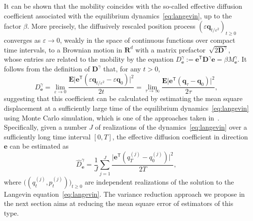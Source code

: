 \documentclass[11pt,a4paper]{article}
\newcommand{\expect}[0]{\mathbf{E}}
\newcommand{\real}{\mathbf R}
\newcommand{\vect}[1]{\boldsymbol{\mathbf #1}}
\newcommand{\mat}[1]{\vect #1}
\renewcommand{\t}{\mathsf T}
\theoremstyle{plain}
\numberwithin{equation}{section}
\renewcommand{\geq}{\geqslant}
\begin{document}
It can be shown that the mobility coincides with the so-called effective diffusion coefficient associated with the equilibrium dynamics~\eqref{eq:langevin},
up to the factor $\beta$.
More precisely,
the diffusively rescaled position process $(\varepsilon \vect q_{t/\varepsilon^2})_{t\geq0}$ converges as $\varepsilon \to 0$,
weakly in the space of continuous functions over compact time intervals,
to a Brownian motion in $\real^d$ with a matrix prefactor~$\sqrt{2 \mat D^{\gamma}}$,
whose entries are related to the mobility by the equation $D^{\gamma}_{\vect e} := \vect e^\t \mat D^{\gamma} \vect e = \beta M^{\gamma}_{\vect e}$.
It follows from the definition of $\mat D^{\gamma}$ that, for any $t > 0$,
\begin{equation}
    \label{eq:einsteins_formula}
    D^{\gamma}_{\vect e}
    =\lim_{\varepsilon \to 0} \frac{\expect\bigl\lvert \vect e^\t (\varepsilon \vect q_{t/\varepsilon^2} - \varepsilon \vect q_0) \bigr\rvert^2}{2 t}
    =\lim_{\tau \to \infty} \frac{\expect \bigl\lvert \vect e^\t (\vect q_\tau - \vect q_0) \bigr\rvert^2}{2\tau},
\end{equation}
suggesting that this coefficient can be calculated by
estimating the mean square displacement at a sufficiently large time of the equilibrium dynamics~\eqref{eq:langevin}
using Monte Carlo simulation,
which is one of the approaches taken in~\cite{MR2427108}.
Specifically, given a number $J$ of realizations of the dynamics~\eqref{eq:langevin} over a sufficiently long time interval $[0, T]$,
the effective diffusion coefficient in direction $\vect e$ can be estimated as
\begin{equation}
    \label{eq:naive_estimator}
    \widehat D^{\gamma}_{\vect e}
    = \frac{1}{J} \sum_{j=1}^{J} \frac{\bigl\lvert \vect e^\t (q^{(j)}_T - q^{(j)}_0) \bigr\rvert^2}{2T},
\end{equation}
where $\bigl((q_t^{(j)}, p_t^{(j)})\bigr)_{t \geq 0}$ are independent realizations of the solution to the Langevin equation~\eqref{eq:langevin}.
The variance reduction approach we propose in the next section aims at reducing the mean square error of estimators of this type.
\end{document}
